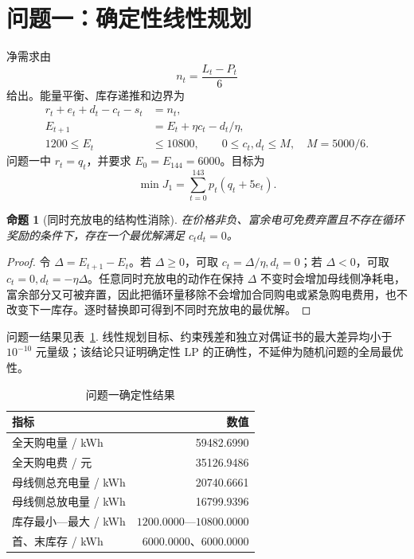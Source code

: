 \documentclass[UTF8,a4paper,zihao=-4,fontset=mac]{ctexart}
\newtheorem{proposition}{命题}
\begin{document}
\section{问题一：确定性线性规划}
净需求由
\begin{equation}
n_t=\frac{L_t-P_t}{6}
\end{equation}
给出。能量平衡、库存递推和边界为
\begin{align}
r_t+e_t+d_t-c_t-s_t&=n_t,\\
E_{t+1}&=E_t+\eta c_t-d_t/\eta,\\
1200\le E_t&\le10800,\qquad 0\le c_t,d_t\le M,\quad M=5000/6.
\end{align}
问题一中 $r_t=q_t$，并要求 $E_0=E_{144}=6000$。目标为
\begin{equation}
\min J_1=\sum_{t=0}^{143}p_t(q_t+5e_t).
\end{equation}

\begin{proposition}[同时充放电的结构性消除]
在价格非负、富余电可免费弃置且不存在循环奖励的条件下，存在一个最优解满足 $c_td_t=0$。
\end{proposition}
\begin{proof}
令 $\Delta=E_{t+1}-E_t$。若 $\Delta\ge0$，可取 $c_t=\Delta/\eta,d_t=0$；若 $\Delta<0$，可取 $c_t=0,d_t=-\eta\Delta$。任意同时充放电的动作在保持 $\Delta$ 不变时会增加母线侧净耗电，富余部分又可被弃置，因此把循环量移除不会增加合同购电或紧急购电费用，也不改变下一库存。逐时替换即可得到不同时充放电的最优解。
\end{proof}

问题一结果见表~\ref{tab:q1}. 线性规划目标、约束残差和独立对偶证书的最大差异均小于 $10^{-10}$ 元量级；该结论只证明确定性 LP 的正确性，不延伸为随机问题的全局最优性。
\begin{table}[H]\centering\small
\caption{问题一确定性结果}\label{tab:q1}
\begin{tabular}{l r}
\toprule
指标 & 数值\\\midrule
全天购电量 / kWh & 59482.6990\\
全天购电费 / 元 & 35126.9486\\
母线侧总充电量 / kWh & 20740.6661\\
母线侧总放电量 / kWh & 16799.9396\\
库存最小—最大 / kWh & $1200.0000$—$10800.0000$\\
首、末库存 / kWh & $6000.0000$、$6000.0000$\\
\bottomrule
\end{tabular}
\end{table}
\end{document}
